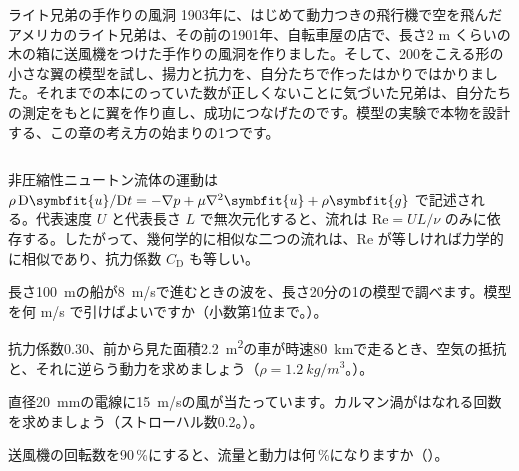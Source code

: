 \begin{column}{ライト兄弟の手作りの風洞}
1903年に、はじめて動力つきの飛行機で空を飛んだアメリカのライト兄弟は、その前の1901年、自転車屋の店で、長さ2 m くらいの木の箱に送風機をつけた手作りの風洞を作りました。そして、200をこえる形の小さな翼の模型を試し、揚力と抗力を、自分たちで作ったはかりではかりました。それまでの本にのっていた数が正しくないことに気づいた兄弟は、自分たちの測定をもとに翼を作り直し、成功につなげたのです。模型の実験で本物を設計する、この章の考え方の始まりの1つです。
\end{column}

\begin{senmonsho}[流体力学の書き方]
\begin{bkhonbun}
非圧縮性ニュートン流体の運動は $\rho\,\mathrm{D}\symbfit{u}/\mathrm{D}t=-\nabla p+\mu\nabla^2\symbfit{u}+\rho\symbfit{g}$ で記述される。代表速度 $U$ と代表長さ $L$ で無次元化すると、流れは $\mathrm{Re}=UL/\nu$ のみに依存する。したがって、幾何学的に相似な二つの流れは、$\mathrm{Re}$ が等しければ力学的に相似であり、抗力係数 $C_{\mathrm D}$ も等しい。
\end{bkhonbun}
\end{senmonsho}

\bkendproblems
{}

\bkproblem 長さ\qty{100}{m}の船が\qty{8}{m/s}で進むときの波を、長さ20分の1の模型で調べます。模型を何 m/s で引けばよいですか（小数第1位まで。\nobreak）。

\bkproblem 抗力係数0.30、前から見た面積\qty{2.2}{m^2}の車が時速\qty{80}{km}で走るとき、空気の抵抗と、それに逆らう動力を求めましょう（$\rho=\qty{1.2}{kg/m^3}$。\nobreak）。

\bkproblem 直径\qty{20}{mm}の電線に\qty{15}{m/s}の風が当たっています。カルマン渦がはなれる回数を求めましょう（ストローハル数0.2。\nobreak）。

\bkproblem 送風機の回転数を90\,\%にすると、流量と動力は何\,\%になりますか（\nobreak{}\nobreak）。

